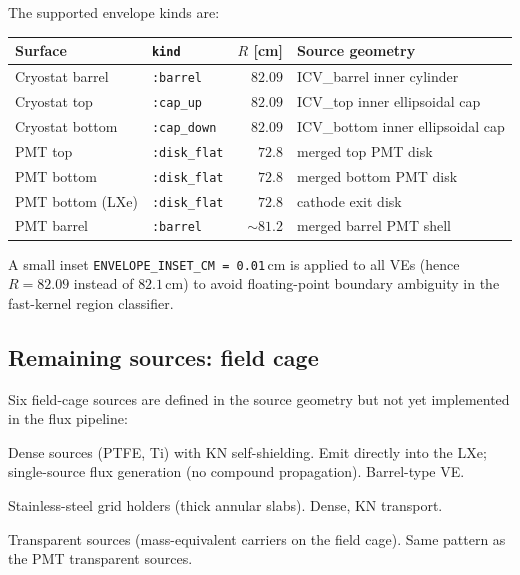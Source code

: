 \documentclass[11pt]{article}
\begin{document}
The supported envelope kinds are:
\begin{center}
\begin{tabular}{llrl}
\toprule
Surface & \texttt{kind} & $R$ [cm] & Source geometry \\
\midrule
Cryostat barrel & \texttt{:barrel}    & $82.09$ & ICV\_barrel inner cylinder \\
Cryostat top    & \texttt{:cap\_up}   & $82.09$ & ICV\_top inner ellipsoidal cap \\
Cryostat bottom & \texttt{:cap\_down} & $82.09$ & ICV\_bottom inner ellipsoidal cap \\
PMT top         & \texttt{:disk\_flat}& $72.8$  & merged top PMT disk \\
PMT bottom      & \texttt{:disk\_flat}& $72.8$  & merged bottom PMT disk \\
PMT bottom (LXe)& \texttt{:disk\_flat}& $72.8$  & cathode exit disk \\
PMT barrel      & \texttt{:barrel}    & $\sim 81.2$ & merged barrel PMT shell \\
\bottomrule
\end{tabular}
\end{center}
A small inset \texttt{ENVELOPE\_INSET\_CM = 0.01}\,cm is applied to all VEs
(hence $R = 82.09$ instead of $82.1$\,cm) to avoid floating-point boundary
ambiguity in the fast-kernel region classifier.

\subsection{Remaining sources: field cage}
\label{sec:source-remaining}

Six field-cage sources are defined in the source geometry but not yet
implemented in the flux pipeline:

\begin{description}[leftmargin=2.5cm,style=nextline]
\item[\texttt{FC\_PTFE}, \texttt{FC\_rings}] Dense sources (PTFE, Ti) with
KN self-shielding. Emit directly into the LXe; single-source flux generation
(no compound propagation). Barrel-type VE.
\item[\texttt{FC\_topgrid}, \texttt{FC\_botgrid}] Stainless-steel grid
holders (thick annular slabs). Dense, KN transport.
\item[\texttt{FC\_resistors}, \texttt{FC\_sensors}] Transparent sources
(mass-equivalent carriers on the field cage). Same pattern as the PMT
transparent sources.
\end{description}
\end{document}
